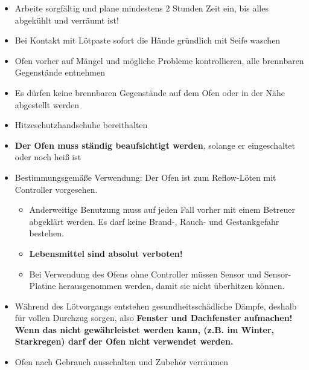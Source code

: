 \documentclass[fontsize=11pt]{scrartcl}
\begin{document}
\begin{itemize}
	\item Arbeite sorgfältig und plane mindestens 2 Stunden Zeit ein, bis alles abgekühlt und verräumt ist!
	\item Bei Kontakt mit Lötpaste sofort die Hände gründlich mit Seife waschen
	\item Ofen vorher auf Mängel und mögliche Probleme kontrollieren,
 alle brennbaren Gegenstände entnehmen
	\item Es dürfen keine brennbaren Gegenstände auf dem Ofen oder in der Nähe abgestellt werden
	\item Hitzeschutzhandschuhe bereithalten
	\item \textbf{Der Ofen muss ständig beaufsichtigt werden}, solange er eingeschaltet oder noch heiß ist
	\item Bestimmungsgemäße Verwendung: Der Ofen ist zum Reflow-Löten mit Controller vorgesehen.
\begin{itemize}
	\setlength{\itemsep}{-3pt}
	\item Anderweitige Benutzung muss auf jeden Fall vorher mit einem Betreuer abgeklärt werden.
	Es darf keine Brand-, Rauch- und Gestankgefahr bestehen.
	\item \textbf{Lebensmittel sind absolut verboten!}
	\item Bei Verwendung des Ofens ohne Controller müssen Sensor und Sensor-Platine herausgenommen werden, damit sie nicht überhitzen können.
\end{itemize}
	\item Während des Lötvorgangs entstehen gesundheitsschädliche Dämpfe, deshalb für vollen Durchzug sorgen, also \textbf{Fenster und Dachfenster aufmachen! Wenn das nicht gewährleistet werden kann, (z.B. im Winter, Starkregen) darf der Ofen nicht verwendet werden.}
	\item Ofen nach Gebrauch ausschalten und Zubehör verräumen
\end{itemize}
\end{document}

